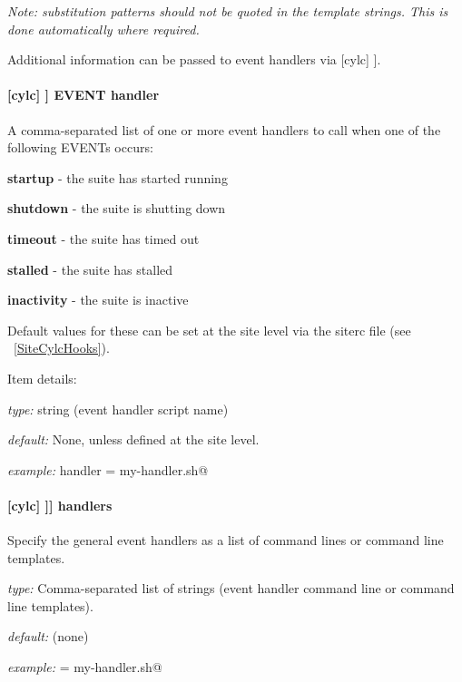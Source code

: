 {\em Note: substitution patterns should not be quoted in the template strings.
This is done automatically where required.}

Additional information can be passed to event handlers via
[cylc] \textrightarrow [[environment]].

\paragraph[EVENT handler]{[cylc] \textrightarrow [[events]] \textrightarrow EVENT handler}

A comma-separated list of one or more event handlers to call when one of the
following EVENTs occurs:
\begin{myitemize}
    \item {\bf startup}  - the suite has started running
    \item {\bf shutdown} - the suite is shutting down
    \item {\bf timeout}  - the suite has timed out
    \item {\bf stalled} - the suite has stalled
    \item {\bf inactivity} - the suite is inactive
\end{myitemize}

Default values for these can be set at the site level via the siterc file
(see ~\ref{SiteCylcHooks}).

Item details:
\begin{myitemize}
    \item {\em type:} string (event handler script name)
    \item {\em default:} None, unless defined at the site level.
    \item {\em example:} \lstinline@startup handler = my-handler.sh@
\end{myitemize}

\paragraph[handlers]{[cylc] \textrightarrow [[[events]]] \textrightarrow handlers}

Specify the general event handlers as a list of command lines or command line
templates.

\begin{myitemize}
    \item {\em type:} Comma-separated list of strings (event handler command line or command line templates).
    \item {\em default:} (none)
    \item {\em example:} \lstinline@handlers = my-handler.sh@
\end{myitemize}

